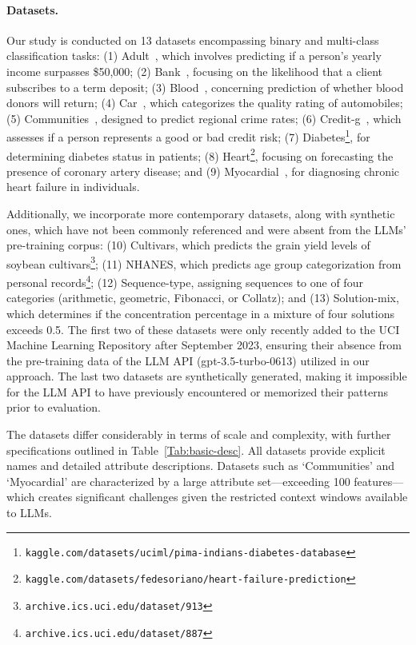 \paragraph{Datasets.}
Our study is conducted on 13 datasets encompassing binary and multi-class classification tasks: (1) Adult~\cite{asuncion2007uci}, which involves predicting if a person's yearly income surpasses \$50,000; (2) Bank~\cite{moro2014data}, focusing on the likelihood that a client subscribes to a term deposit; (3) Blood~\cite{yeh2009knowledge}, concerning prediction of whether blood donors will return; (4) Car~\cite{kadra2021well}, which categorizes the quality rating of automobiles; (5) Communities~\cite{misc_communities_and_crime_183}, designed to predict regional crime rates; (6) Credit-g~\cite{kadra2021well}, which assesses if a person represents a good or bad credit risk; (7) Diabetes\footnote{\texttt{kaggle.com/datasets/uciml/pima-indians-diabetes-database}}, for determining diabetes status in patients; (8) Heart\footnote{\texttt{kaggle.com/datasets/fedesoriano/heart-failure-prediction}}, focusing on forecasting the presence of coronary artery disease; and (9) Myocardial~\cite{misc_myocardial_infarction_complications_579}, for diagnosing chronic heart failure in individuals.

Additionally, we incorporate more contemporary datasets, along with synthetic ones, which have not been commonly referenced and were absent from the LLMs’ pre-training corpus: (10) Cultivars, which predicts the grain yield levels of soybean cultivars\footnote{\texttt{archive.ics.uci.edu/dataset/913}}; (11) NHANES, which predicts age group categorization from personal records\footnote{\texttt{archive.ics.uci.edu/dataset/887}}; (12) Sequence-type, assigning sequences to one of four categories (arithmetic, geometric, Fibonacci, or Collatz); and (13) Solution-mix, which determines if the concentration percentage in a mixture of four solutions exceeds 0.5. The first two of these datasets were only recently added to the UCI Machine Learning Repository after September 2023, ensuring their absence from the pre-training data of the LLM API (gpt-3.5-turbo-0613) utilized in our approach. The last two datasets are synthetically generated, making it impossible for the LLM API to have previously encountered or memorized their patterns prior to evaluation.

The datasets differ considerably in terms of scale and complexity, with further specifications outlined in Table~\ref{Tab:basic-desc}.
All datasets provide explicit names and detailed attribute descriptions. Datasets such as `Communities' and `Myocardial' are characterized by a large attribute set—exceeding 100 features—which creates significant challenges given the restricted context windows available to LLMs.

